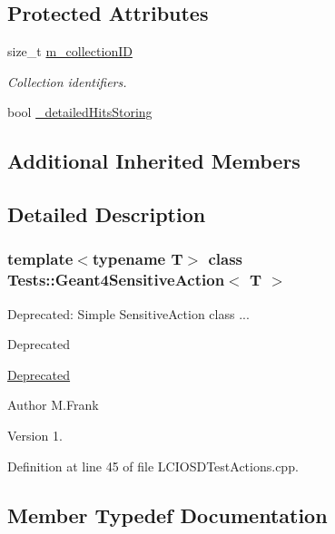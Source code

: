 \subsection*{Protected Attributes}
\begin{DoxyCompactItemize}
\item 
size\+\_\+t \hyperlink{class_tests_1_1_geant4_sensitive_action_a44a9e95251d84b3da5f5115530f9cde8}{m\+\_\+collection\+ID}
\begin{DoxyCompactList}\small\item\em Collection identifiers. \end{DoxyCompactList}\item 
bool \hyperlink{class_tests_1_1_geant4_sensitive_action_ab3efbf4bd030df529554961e46bb0823}{\+\_\+detailed\+Hits\+Storing}
\end{DoxyCompactItemize}
\subsection*{Additional Inherited Members}


\subsection{Detailed Description}
\subsubsection*{template$<$typename T$>$\newline
class Tests\+::\+Geant4\+Sensitive\+Action$<$ T $>$}

Deprecated\+: Simple Sensitive\+Action class ... 

\begin{DoxyRefDesc}{Deprecated}
\item[\hyperlink{deprecated__deprecated000008}{Deprecated}]\end{DoxyRefDesc}
\begin{DoxyAuthor}{Author}
M.\+Frank 
\end{DoxyAuthor}
\begin{DoxyVersion}{Version}
1. 
\end{DoxyVersion}


Definition at line 45 of file L\+C\+I\+O\+S\+D\+Test\+Actions.\+cpp.



\subsection{Member Typedef Documentation}
\hypertarget{class_tests_1_1_geant4_sensitive_action_afb2235077e4e86f00859155e5379bbad}{}\label{class_tests_1_1_geant4_sensitive_action_afb2235077e4e86f00859155e5379bbad} 
